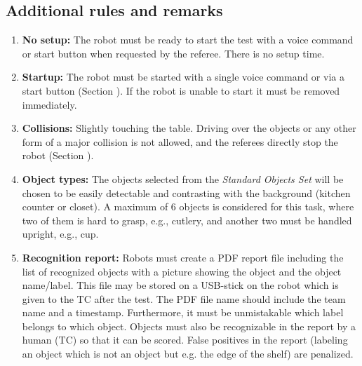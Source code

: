 \subsection{Additional rules and remarks}
\label{sattu:add}
\begin{enumerate}
\item \textbf{No setup:} The robot must be ready to start the test with a voice command or start button when requested by the referee. There is no setup time.
\item \textbf{Startup:} The robot must be started with a single voice command or via a start button (Section ). If the robot is unable to start it must be removed immediately.
\item \textbf{Collisions:} Slightly touching the table.
  Driving over the objects or any other form of a major collision is not allowed, and the referees directly stop the robot (Section ).
\item\label{sattu:objs} \textbf{Object types:} The objects selected from the \textit{Standard Objects Set} will be chosen to be easily detectable and contrasting with the background (kitchen counter or closet). A maximum of 6 objects is considered for this task, where two of them is hard to grasp, e.g., cutlery, and another two must be handled upright, e.g., cup.
\item \textbf{Recognition report:} Robots must create a PDF report file including the list of recognized objects with a picture showing the object and the object name/label.
  This file may be stored on a USB-stick on the robot which is given to the TC after the test. The PDF file name should include the team name and a timestamp. 
  Furthermore, it must be unmistakable which label belongs to which object. Objects must also be recognizable in the report by a human (TC) so that it can be scored. 
False positives in the report (labeling an object which is not an object but e.g. the edge of the shelf) are penalized.

\end{enumerate}
